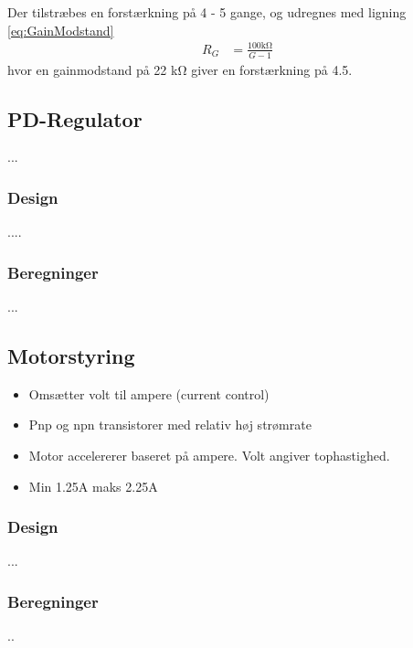 Der tilstræbes en forstærkning på 4 - 5 gange, og udregnes med ligning \ref{eq:GainModstand}
\begin{align}
	R_G & = \frac{100 \si{\kilo\ohm}}{G-1} \label{eq:GainModstand}
\end{align}
hvor en gainmodstand på 22 \si{\kilo\ohm} giver en forstærkning på 4.5.

\subsection{PD-Regulator}
...
\subsubsection{Design}
....
\subsubsection{Beregninger}
...

\subsection{Motorstyring}\label{sec:sec_motorstyring}

\begin{itemize}
	\item Omsætter volt til ampere (current control)
	\item Pnp og npn transistorer med relativ høj strømrate
	\item Motor accelererer baseret på ampere. Volt angiver tophastighed.
	\item Min 1.25A maks 2.25A
\end{itemize}

\subsubsection{Design}
...

\subsubsection{Beregninger}
..

